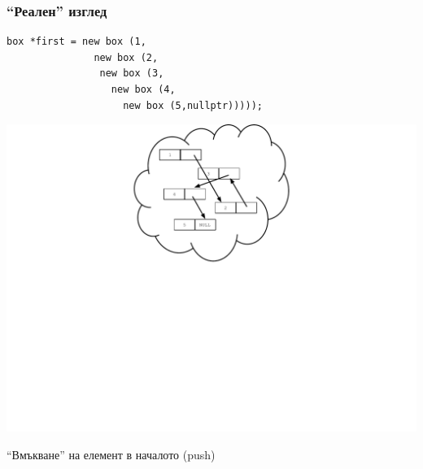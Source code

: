 \documentclass{beamer}
\begin{document}
\begin{frame}[fragile]
\frametitle{``Реален'' изглед}

\begin{flushleft}
\begin{lstlisting}
box *first = new box (1,
               new box (2, 
                new box (3, 
                  new box (4, 
                    new box (5,nullptr)))));
\end{lstlisting}  
\end{flushleft}


\includegraphics[width=14.0cm]{images/02_ll_boxcloud}

\end{frame}



\begin{frame}
\centerline{``Вмъкване'' на елемент в началото (push)}
\end{frame}
\end{document}
